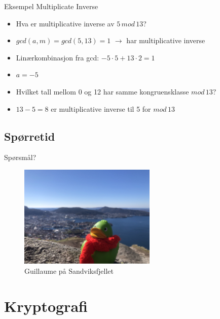 \begin{frame}{Eksempel Multiplicate Inverse}
\begin{itemize}
\item Hva er multiplicative inverse av $5\, mod\, 13$?
\item $gcd(a,m) = gcd(5,13)=1$ $\rightarrow$ har multiplicative inverse
\item Linærkombinasjon fra gcd: $-5\cdot 5+13\cdot 2=1$
\item $a = -5$
\item Hvilket tall mellom 0 og 12 har samme kongruensklasse $mod\, 13?$ 
\item $13-5=8$ er multiplicative inverse til 5 for $mod\, 13$
\end{itemize}
\end{frame}

\subsection*{Spørretid}
\begin{frame}{Spørsmål?}
    \begin{figure}
        \centering
        \includegraphics[height = 4.9cm]{images/guillaume1.jpg}
        \caption{Guillaume på Sandviksfjellet}
        \label{fig:guillaume1}
    \end{figure}
\end{frame}


\section{Kryptografi}

